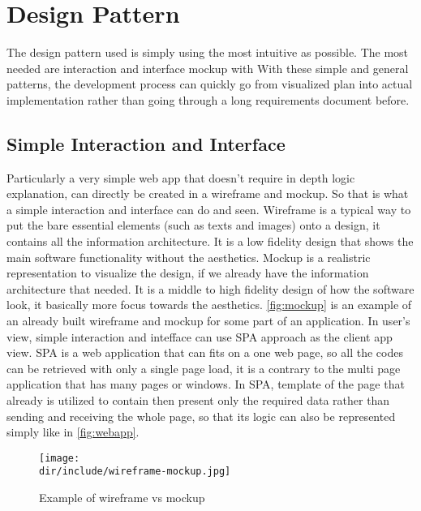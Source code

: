 \section{Design Pattern}
\label{sec:design-pattern}

The design pattern used is simply using the most intuitive as possible.
The most needed are interaction and interface mockup with
With these simple and general patterns, the development process can quickly go from visualized plan into actual implementation rather than going through a long requirements document before.

\subsection{Simple Interaction and Interface}
\label{ssec:simple-interfaction}

Particularly a very simple web app that doesn't require in depth logic explanation, can directly be created in a wireframe and mockup.
So that is what a simple interaction and interface can do and seen.
Wireframe is a typical way to put the bare essential elements (such as texts and images) onto a design, it contains all the information architecture.
It is a low fidelity design that shows the main software functionality without the aesthetics.
Mockup is a realistric representation to visualize the design, if we already have the information architecture that needed.
It is a middle to high fidelity design of how the software look, it basically more focus towards the aesthetics.
\autoref{fig:mockup} is an example of an already built wireframe and mockup for some part of an application.
In user's view, simple interaction and intefface can use \ac{SPA} approach as the client app view.
\ac{SPA} is a web application that can fits on a one web page, so all the codes can be retrieved with only a single page load, it is a contrary to the multi page application that has many pages or windows.
In \ac{SPA}, template of the page that already is utilized to contain then present only the required data rather than sending and receiving the whole page, so that its logic can also be represented simply like in \autoref{fig:webapp}.

\begin{figure}[htbp]
    \centering
    \texttt{[image: \\dir/include/wireframe-mockup.jpg]}
    \caption[Wireframe vs Mockup Example]{Example of wireframe vs mockup \autocite{Trentini2015WM}}
    \label{fig:webapp}
\end{figure}


